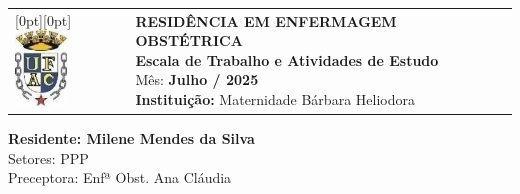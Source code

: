 \begin{flushleft}
    \begin{tabular}{@{}l l@{}}
        \raisebox{0pt}[0pt][0pt]{\includegraphics[height=2cm]{escala/recursos/ufac-logo.jpeg}} &
        \parbox[b][2cm][t]{0.82\linewidth}{
            \raggedright
            {\fontsize{11pt}{13pt}\selectfont
                \textbf{RESIDÊNCIA EM ENFERMAGEM OBSTÉTRICA} \\
                \textbf{Escala de Trabalho e Atividades de Estudo} \\
                Mês:\textbf{ Julho / 2025 }\\
                \textbf{Instituição:} Maternidade Bárbara Heliodora
            }
        }
    \end{tabular}

    {\fontsize{12pt}{14pt}\selectfont
        \textbf{Residente: Milene Mendes da Silva} \\
        Setores: PPP\\
        Preceptora: Enfª Obst. Ana Cláudia
    }
\end{flushleft}
